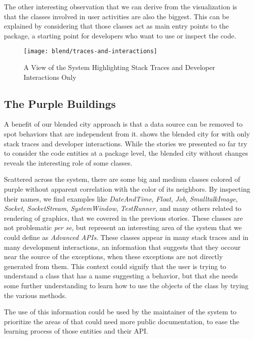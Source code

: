 The other interesting observation that we can derive from the visualization is that the  classes involved in user activities are also the biggest. This can be explained by considering that those classes act as main entry points to the package, a starting point for developers who want to use or inspect the code.


\begin{figure*}[ht]
\centering
\texttt{[image: blend/traces-and-interactions]}
\caption{A View of the System Highlighting Stack Traces and Developer Interactions Only}
\label{fig:traces-and-interactions}
\end{figure*}

\subsection{The Purple Buildings}

A benefit of our blended city approach is that a data source can be removed to spot behaviors that are independent from it.  shows the blended city for \pha with only stack traces and developer interactions. While the stories we presented so far try to consider the code entities at a package level,  the blended city without changes reveals the interesting role of some classes.

 Scattered across the system, there are some big and medium classes colored of purple without apparent correlation with the color of its neighbors. By inspecting their names, we find examples like \textit{DateAndTime}, \textit{Float}, \textit{Job}, \textit{SmalltalkImage}, \textit{Socket}, \textit{SocketStream},  \textit{SystemWindow}, \textit{TestRunner}, and many others related to rendering of graphics, that we covered in the previous stories. These classes are not problematic \emph{per se}, but represent an interesting area of the system that we could define as \emph{Advanced APIs}. These classes appear in many stack traces and in many development interactions, an information that suggests that they occour near the source of the exceptions, when these exceptions are not directly generated from them. This context could signify that the user is trying to understand a class that has a name suggesting a behavior, but that she needs some further understanding to learn how to use the objects of the class by trying the various methods. 

The use of this information could be used by the maintainer of the system to prioritize the areas of that could need more public documentation, to ease the learning process of those entities and their API.


